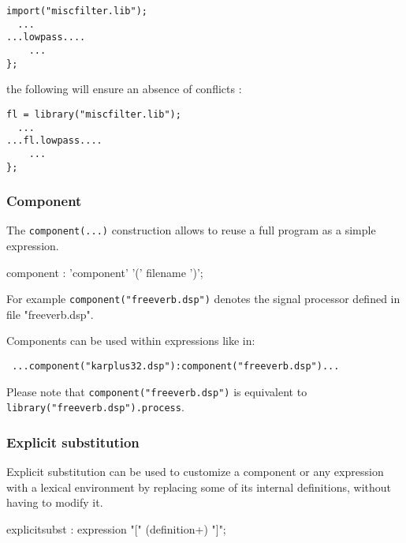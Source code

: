 \begin{lstlisting}
import("miscfilter.lib");
  ...
...lowpass....
	...
};
\end{lstlisting}
the following will ensure an absence of conflicts : 
\begin{lstlisting}
fl = library("miscfilter.lib");
  ...
...fl.lowpass....
	...
};
\end{lstlisting}

\subsubsection{Component} 
The \lstinline'component(...)' construction allows to reuse a full \faust program as a simple expression.

\begin{rail}
component :    'component' '(' filename ')';
\end{rail}

 For example \lstinline'component("freeverb.dsp")' denotes the signal processor defined in file "freeverb.dsp". 
 
 Components can be used within expressions like in: 
 \begin{lstlisting}
 ...component("karplus32.dsp"):component("freeverb.dsp")... 
 \end{lstlisting}
 
 Please note that \lstinline'component("freeverb.dsp")' is equivalent to \lstinline'library("freeverb.dsp").process'.

\subsubsection{Explicit substitution} 

Explicit substitution can be used to customize a component or any expression with a lexical environment by replacing some of its internal definitions, without having to modify it.


\begin{rail}
explicitsubst : expression "[" (definition+) "]";
\end{rail}

